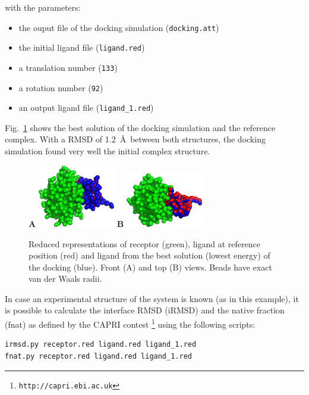 \documentclass[12pt,a4paper]{article}
\begin{document}
with the parameters:
\begin{itemize}
\item the ouput file of the docking simulation ({\tt docking.att})
\item the initial ligand file ({\tt ligand.red})
\item a translation number ({\tt 133})
\item a rotation number ({\tt 92})
\item an output ligand file ({\tt ligand\_1.red})
\end{itemize}

Fig.~\ref{1CGI_dock} shows the best solution of the docking simulation and the
reference complex. With a RMSD of 1.2~\AA\ between both structures, 
the docking simulation found very well the initial complex structure.

\begin{figure}[htbp]
\center
{\textbf A}
\includegraphics*[width=0.30\textwidth]{img/1CGI_dock1_front.png}
\hspace*{2cm}
{\textbf B}
\includegraphics*[width=0.30\textwidth]{img/1CGI_dock1_top.png}
\caption{Reduced representations of receptor (green), ligand at reference 
position (red) and ligand from the best solution (lowest energy) of the 
docking (blue). Front (A) and top (B) views. Beads have exact van der 
Waals radii.}
\label{1CGI_dock}
\end{figure}


In case an experimental structure of the system is known (as in this example), 
it is possible to calculate the interface RMSD (iRMSD) and the native fraction 
(fnat) as defined by the CAPRI contest \footnote{\tt http://capri.ebi.ac.uk}
using the following scripts:

\begin{verbatim}
irmsd.py receptor.red ligand.red ligand_1.red
fnat.py receptor.red ligand.red ligand_1.red
\end{verbatim}
\end{document}

